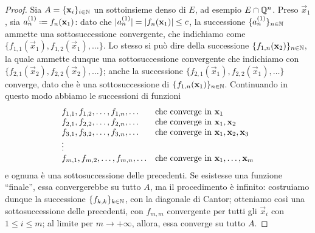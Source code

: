 \begin{proof}
    Sia $A=\{\mathbf{x}_i\}_{i\in\mathbb{N}}$ un sottoinsieme denso di $E$, ad esempio $E\cap\mathbb{Q}^n$.
    Preso $\vec x_1$, sia $a^{(1)}_n\defeq f_n(\vec x_1)$: dato che $\lvert a^{(1)}_n\rvert=\lvert f_n(\mathbf{x}_1)\rvert\le c$, la successione $\{a^{(1)}_n\}_{n\in\mathbb{N}}$ ammette una sottosuccessione convergente, che indichiamo come $\{f_{1,1}(\vec x_1),f_{1,2}(\vec x_1),\dotsc\}$.
    Lo stesso si può dire della successione $\{f_{1,n}(\mathbf{x}_2)\}_{n\in\mathbb{N}}$, la quale ammette dunque una sottosuccessione convergente che indichiamo con $\{f_{2,1}(\vec x_2),f_{2,2}(\vec x_2),\dotsc\}$; anche la successione $\{f_{2,1}(\vec x_1),f_{2,2}(\vec x_1),\dotsc\}$ converge, dato che è una sottosuccessione di $\{f_{1,n}(\mathbf{x}_1)\}_{n\in\mathbb{N}}$.
    Continuando in questo modo abbiamo le successioni di funzioni
    \begin{equation}
        \begin{array}[h]{ll}
            f_{1,1},f_{1,2},\dotsc,f_{1,n},\dotsc & \text{che converge in }\vec x_1\\
            f_{2,1},f_{2,2},\dotsc,f_{2,n},\dotsc & \text{che converge in }\vec x_1,\vec x_2\\
            f_{3,1},f_{3,2},\dotsc,f_{3,n},\dotsc & \text{che converge in }\vec x_1,\vec x_2,\vec x_3\\
            \vdots & \\
            f_{m,1},f_{m,2},\dotsc,f_{m,n},\dotsc & \text{che converge in }\vec x_1,\dotsc,\vec x_m
        \end{array}
    \end{equation}
    e ognuna è una sottosuccessione delle precedenti.
    Se esistesse una funzione ``finale'', essa convergerebbe su tutto $A$, ma il procedimento è infinito: costruiamo dunque la successione $\{f_{k,k}\}_{k\in\mathbb{N}}$, con la diagonale di Cantor; otteniamo cos\`i una sottosuccessione delle precedenti, con $f_{m,m}$ convergente per tutti gli $\vec x_i$ con $1\le i\le m$; al limite per $m\to+\infty$, allora, essa converge su tutto $A$.


\end{proof}
